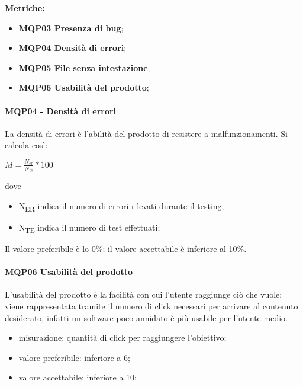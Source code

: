 \documentclass[../piano_di_qualifica.tex]{subfiles}
\begin{document}
\textbf{Metriche:}
\smallbreak
\begin{itemize}
	\item \textbf{MQP03 Presenza di bug};
	\item \textbf{MQP04 Densità di errori};
	\item \textbf{MQP05 File senza intestazione};
	\item \textbf{MQP06 Usabilità del prodotto};
\end{itemize}


\paragraph{MQP04 - Densità di errori}
La densità di errori è l'abilità del prodotto di resistere a malfunzionamenti. Si calcola così:\par

\begin{center}
$M = \frac{N_{er}}{N_{te}} * 100$
\end{center}

dove
\smallbreak
\begin{itemize}
\item N\textsubscript{ER} indica il numero di errori rilevati durante il testing;
\item N\textsubscript{TE} indica il numero di test effettuati;
\end{itemize}

Il valore preferibile è lo 0\%; il valore accettabile è inferiore al 10\%.

\paragraph{MQP06 Usabilità del prodotto}
L'usabilità del prodotto è la facilità con cui l’utente raggiunge ciò che vuole; viene rappresentata tramite il numero di click necessari per arrivare al contenuto desiderato, infatti un software poco annidato è più usabile per l'utente medio.
\smallbreak
\begin{itemize}
\item misurazione: quantità di click per raggiungere l'obiettivo;
\item valore preferibile: inferiore a 6;
\item valore accettabile: inferiore a 10;
\end{itemize}
\end{document}
